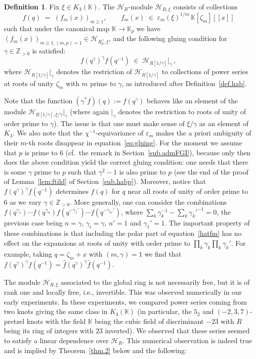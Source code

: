 \documentclass[12pt,reqno]{amsart}
\theoremstyle{definition}
\newtheorem{definition}[proposition]{Definition}
\def\BZ{\mathbb Z}
\def\BK{\mathbb K}
\def\calH{\mathcal H}
\def\ve{\varepsilon}
\def\be{\begin{equation}}
\def\ee{\end{equation}}
\def\z{\zeta}
\def\={\;=\;}
\def\inn{\;\in\;}
\begin{document}
\begin{definition}
\label{def.HRmod}
Fix $\xi \in K_3(\BK)$. The $\calH_{R}$-module $\calH_{R,\xi}$
consists of collections
\be
\label{fcyclic}
f(q) \=(f_{m}(x))_{m\geq1}, \qquad
f_{m}(x)\inn \varepsilon_{m}(\xi)^{1/m}\,
\BK[\z_m][\![x]\!]
\ee
such that under the canonical map $\BK\to\BK_p$ we have
$(f_{m}(x))_{m\geq 1,(m,p)=1}\in\calH_{R^\wedge_p,\xi}$, and the following
gluing condition for $\gamma\in\BZ_{>0}$ is satisfied:
\be
\label{eq:gluing}
f(q^\gamma)^\gamma f(q^{-1})\inn \calH_{R[1/\gamma]}|_{\gamma}\,,
\ee
where $\calH_{R[1/\gamma]}|_{\gamma}$ denotes the restriction of $\calH_{R[1/\gamma]}$
to collections of power series at roots of unity $\z_m$ with $m$ prime to $\gamma$,
as introduced after Definition~\ref{def.hab}.
\end{definition}
Note that the function $(\gamma^* f)(q):=f(q^\gamma)$ behaves like an element of
the module $\calH_{R[1/\gamma],\xi/\gamma}|_{\gamma}$ (where again $|_\gamma$ denotes
the restriction to roots of unity of order prime to $\gamma$).
The issue is that one must make sense of $\xi/\gamma$ as an element of $K_3$.
We also note that the $\chi^{-1}$-equivariance of $\ve_m$ makes the a priori
ambiguity of their $m$-th roots disappear in equation~\eqref{eq:gluing}. For the
moment we assume that $p$ is prime to $6$ (cf.~the remark in Section~\ref{sub.admFGI}),
because only then does the above condition yield the correct gluing condition:
one needs that there is some $\gamma$ prime to $p$ such that
$\gamma^2-1$ is also prime to $p$ (see the end of the proof of Lemma~\ref{lem:ftild}
of Section~\ref{sub.habp}).
Moreover, notice that $f(q^{\gamma})^{\gamma}f(q^{-1})$ determines
$f(q)$ for $q$ near all roots of unity of order prime to $6$ as we vary
$\gamma\in\BZ_{>0}$. More generally, one can consider the combinations
$f(q^{\gamma_1})\cdots f(q^{\gamma_n})f(q^{-\gamma_1'})\cdots f(q^{-\gamma_{n'}'})$,
where $\sum_{k}\gamma_k^{-1}-\sum_k\gamma_{k}'^{-1}=0$,
the previous case being $n=\gamma$, $\gamma_i=\gamma$, $n'=1$ and $\gamma_1'=1$.
The important property of these combinations is that including the polar
part of equation~\eqref{hatfm} has no effect on the
expansions at roots of unity with order prime to $\prod_k\gamma_k\prod_k\gamma_k'$.
For example, taking $q=\z_m+x$ with $(m,\gamma)=1$ we find that
$f(q^\gamma)^\gamma f(q^{-1})=\widehat{f}(q^\gamma)^\gamma \widehat{f}(q^{-1})$.

The module $\calH_{R,\xi}$ associated to the global ring is not necessarily free,
but it is of rank one and locally free, i.e., invertible.
This was observed numerically in our early experiments. In these experiments, we
compared power series coming from two knots giving the same class in $K_3(\BK)$ (in
particular, the $5_2$ and $(-2,3,7)$-pretzel knots with the field $\BK$ being the
cubic field of discriminant $-23$ with $R$ being its ring of integers with $23$
inverted). We observed that these series seemed to satisfy a linear dependence
over $\calH_R$. This numerical observation is indeed true and is implied by
Theorem~\ref{thm.2} below and the following:
\end{document}
